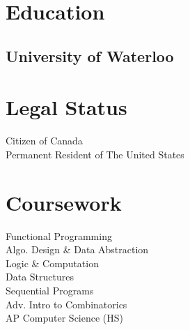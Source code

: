 \documentclass[letterpaper]{deedy-resume} %
\begin{document}
\begin{minipage}[t]{0.33\textwidth} %


  \section{Education} 

  \subsection{University of Waterloo}


  \sectionspace %



  \section{Legal Status} 

  Citizen of Canada \\
  Permanent Resident of The United States

  \sectionspace %

  

  \section{Coursework}

  Functional Programming \\
  Algo. Design \& Data Abstraction \\
  Logic \& Computation \\
  Data Structures \\
  Sequential Programs \\
  Adv. Intro to Combinatorics \\
  AP Computer Science (HS)


\end{minipage}
\end{document}
